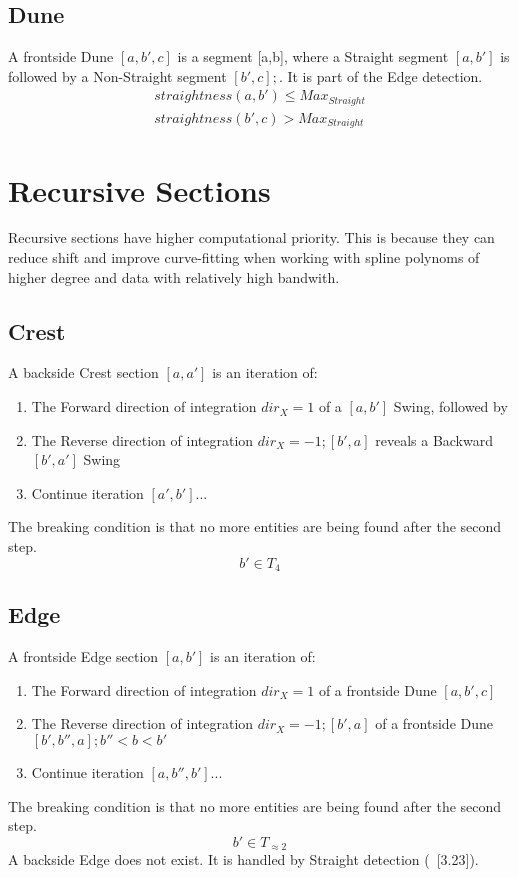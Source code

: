 \documentclass{report}
\begin{document}
\subsection{Dune}
A frontside Dune $[a,b',c]$ is a segment [a,b], where a Straight segment $[a,b']$ is followed by a Non-Straight segment $[b',c]; $. It is part of the Edge detection.
\begin{align}
straightness(a,b')\leq Max_{Straight}\\ straightness(b',c)> Max_{Straight}
\end{align}

\section{Recursive Sections}
Recursive sections have higher computational priority. This is because they can reduce shift and improve curve-fitting when working with spline polynoms of higher degree and data with relatively high bandwith.

\subsection{Crest}
A backside Crest section $[a,a']$ is an iteration of:
\begin{enumerate}
\item The Forward direction of integration $dir_{X}=1$ of a $[a,b']$ Swing, followed by 
\item The Reverse direction of integration $dir_{X}=-1;[b',a]$ reveals a Backward $[b',a']$ Swing
\item Continue iteration $[a',b']...$
\end{enumerate}
The breaking condition is that no more entities are being found after the second step.
\begin{equation}
b' \in T_{4}
\end{equation}

\subsection{Edge}
A frontside Edge section $[a,b']$ is an iteration of:
\begin{enumerate}
\item The Forward direction of integration $dir_{X}=1$ of a frontside Dune $[a,b',c]$
\item The Reverse direction of integration $dir_{X}=-1;[b',a]$ of a frontside Dune $[b',b'',a]; b''<b<b'$ 
\item Continue iteration $[a,b'',b']...$
\end{enumerate}
The breaking condition is that no more entities are being found after the second step.
\begin{equation}
b' \in T_{\approx 2}
\end{equation}
A backside Edge does not exist. It is handled by Straight detection (~\cite{Analyzer}[3.23]).
\end{document}
